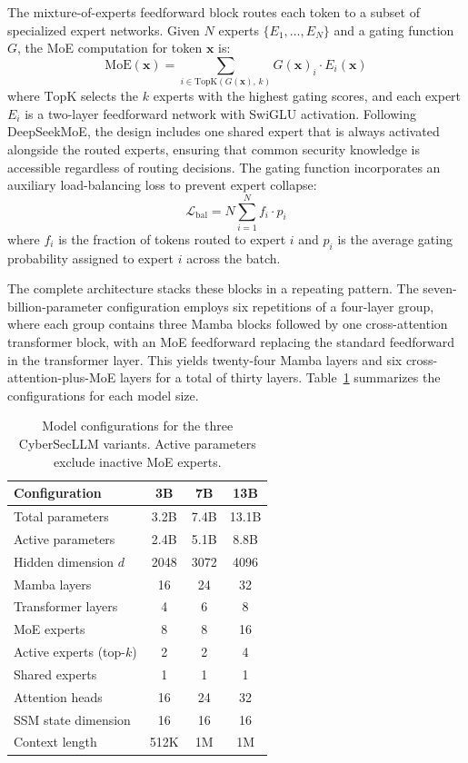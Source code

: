 \documentclass[journal]{IEEEtran}
\newcommand{\modelname}{CyberSecLLM}
\begin{document}
The mixture-of-experts feedforward block routes each token to a subset of specialized expert networks. Given $N$ experts $\{E_1, \ldots, E_N\}$ and a gating function $G$, the MoE computation for token $\mathbf{x}$ is:
\begin{equation}
\text{MoE}(\mathbf{x}) = \sum_{i \in \text{TopK}(G(\mathbf{x}),\, k)} G(\mathbf{x})_i \cdot E_i(\mathbf{x})
\label{eq:moe}
\end{equation}
where $\text{TopK}$ selects the $k$ experts with the highest gating scores, and each expert $E_i$ is a two-layer feedforward network with SwiGLU activation. Following DeepSeekMoE, the design includes one shared expert that is always activated alongside the routed experts, ensuring that common security knowledge is accessible regardless of routing decisions. The gating function incorporates an auxiliary load-balancing loss to prevent expert collapse:
\begin{equation}
\mathcal{L}_{\text{bal}} = N \sum_{i=1}^{N} f_i \cdot p_i
\label{eq:load_balance}
\end{equation}
where $f_i$ is the fraction of tokens routed to expert $i$ and $p_i$ is the average gating probability assigned to expert $i$ across the batch.

The complete architecture stacks these blocks in a repeating pattern. The seven-billion-parameter configuration employs six repetitions of a four-layer group, where each group contains three Mamba blocks followed by one cross-attention transformer block, with an MoE feedforward replacing the standard feedforward in the transformer layer. This yields twenty-four Mamba layers and six cross-attention-plus-MoE layers for a total of thirty layers. Table~\ref{tab:model_configs} summarizes the configurations for each model size.

\begin{table}[!t]
\centering
\caption{Model configurations for the three \modelname{} variants. Active parameters exclude inactive MoE experts.}
\label{tab:model_configs}
\renewcommand{\arraystretch}{1.1}
\begin{tabular}{lccc}
\toprule
\textbf{Configuration} & \textbf{3B} & \textbf{7B} & \textbf{13B} \\
\midrule
Total parameters       & 3.2B & 7.4B & 13.1B \\
Active parameters      & 2.4B & 5.1B & 8.8B \\
Hidden dimension $d$   & 2048 & 3072 & 4096 \\
Mamba layers           & 16   & 24   & 32 \\
Transformer layers     & 4    & 6    & 8 \\
MoE experts            & 8    & 8    & 16 \\
Active experts (top-$k$) & 2  & 2    & 4 \\
Shared experts         & 1    & 1    & 1 \\
Attention heads        & 16   & 24   & 32 \\
SSM state dimension    & 16   & 16   & 16 \\
Context length         & 512K & 1M   & 1M \\
\bottomrule
\end{tabular}
\end{table}
\end{document}
